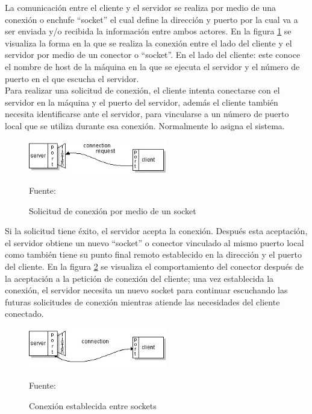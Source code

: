 La comunicación entre el cliente y el servidor se realiza por medio de una conexión o enchufe ``socket'' el cual define la dirección y puerto por la cual va a ser enviada y/o recibida la información entre ambos actores. En la figura \ref{fig:socket_request} se visualiza la forma en la que se realiza la conexión entre el lado del cliente y el servidor por medio de un conector o ``socket''. En el lado del cliente: este conoce el nombre de host de la máquina en la que se ejecuta el servidor y el número de puerto en el que escucha el servidor.\\

Para realizar una solicitud de conexión, el cliente intenta conectarse con el servidor en la máquina y el puerto del servidor, además el cliente también necesita identificarse ante el servidor, para vincularse a un número de puerto local que se utiliza durante esa conexión. Normalmente lo asigna el sistema.\\

\begin{figure}[H]
    \begin{center}
        \includegraphics[width=6cm]{img/capitulo_2/socket_request.jpg}
        \caption{Solicitud de conexión por medio de un socket\\}
        Fuente: \cite{socketconnection}
        \label{fig:socket_request}
    \end{center}
\end{figure}

Si la solicitud tiene éxito, el servidor acepta la conexión. Después esta aceptación, el servidor obtiene un nuevo ``socket'' o conector vinculado al mismo puerto local como también tiene su punto final remoto establecido en la dirección y el puerto del cliente. En la figura \ref{fig:socket_connection} se visualiza el comportamiento del conector después de la aceptación a la petición de conexión del cliente; una vez establecida la conexión, el servidor necesita un nuevo socket para continuar escuchando las futuras solicitudes de conexión mientras atiende las necesidades del cliente conectado.\\

\begin{figure}[H]
    \begin{center}
        \includegraphics[width=6cm]{img/capitulo_2/socket_connection.jpg}
        \caption{Conexión establecida entre sockets\\}
        Fuente: \cite{socketconnection}
        \label{fig:socket_connection}
    \end{center}
\end{figure}

